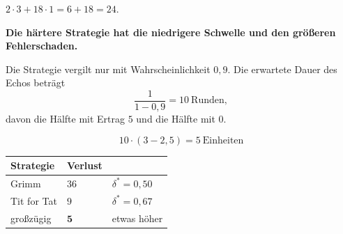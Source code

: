 \begin{aufgabe}
 $2\cdot3 + 18\cdot1 = 6+18 = 24$.

\begin{center}
\begin{minipage}{0.9\textwidth}
\textbf{Die härtere Strategie hat die niedrigere Schwelle und den größeren Fehlerschaden.}
\end{minipage}
\end{center}

Die Strategie vergilt nur mit Wahrscheinlichkeit $0{,}9$. Die erwartete Dauer des Echos beträgt
\[ \frac{1}{1-0{,}9} = 10 \ \text{Runden}, \]
davon die Hälfte mit Ertrag $5$ und die Hälfte mit $0$.

\[ 10\cdot(3 - 2{,}5) = 5 \ \text{Einheiten} \]

\begin{center}
{\small
\renewcommand{\arraystretch}{1.5}
\begin{tabular}{@{}P{2.8cm}P{2.0cm}P{2.4cm}@{}}
\toprule
\textbf{Strategie} & \textbf{Verlust} & \\
\midrule
Grimm & $36$ & $\delta^{*}=0{,}50$\\
Tit for Tat & $9$ & $\delta^{*}=0{,}67$\\
großzügig & $\mathbf{5}$ & etwas höher\\
\bottomrule
\end{tabular}}
\end{center}

\begin{center}
\begin{minipage}{0.88\textwidth}
\end{minipage}
\end{center}
\end{aufgabe}

